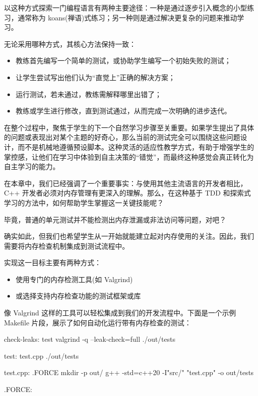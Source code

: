 以这种方式探索一门编程语言有两种主要途径：一种是通过逐步引入概念的小型练习，通常称为 koans(禅语)式练习；另一种则是通过解决更复杂的问题来推动学习。

无论采用哪种方式，其核心方法保持一致：

\begin{itemize}
\item 
教练首先编写一个简单的测试，或协助学生编写一个初始失败的测试；

\item 
让学生尝试写出他们认为“直觉上”正确的解决方案；

\item 
运行测试，若未通过，教练需解释哪里出错了；

\item 
教练或学生进行修改，直到测试通过，从而完成一次明确的进步迭代。
\end{itemize}

在整个过程中，聚焦于学生的下一个自然学习步骤至关重要。如果学生提出了具体的问题或表现出对某个主题的好奇心，那么当前的测试完全可以围绕这些问题设计，而不是机械地遵循预设脚本。这种灵活的适应性教学方式，有助于增强学生的掌控感，让他们在学习中体验到自主决策的“错觉”，而最终这种感觉会真正转化为自主学习的能力。


在本章中，我们已经强调了一个重要事实：与使用其他主流语言的开发者相比，C++ 开发者必须对内存管理有更深入的理解。那么，在这种基于 TDD 和探索式学习的方法中，如何帮助学生掌握这一关键技能呢？

毕竟，普通的单元测试并不能检测出内存泄漏或非法访问等问题，对吧？

确实如此，但我们也希望学生从一开始就能建立起对内存使用的关注。因此，我们需要将内存检查机制集成到测试流程中。

实现这一目标主要有两种方式：

\begin{itemize}
\item 
使用专门的内存检测工具(如 Valgrind)

\item 
或选择支持内存检查功能的测试框架或库
\end{itemize}

像 Valgrind 这样的工具可以轻松集成到我们的开发流程中。下面是一个示例 Makefile 片段，展示了如何自动化运行带有内存检查的测试：

\begin{shell}
check-leaks: test
  valgrind -q --leak-check=full ./out/tests

test: test.cpp
  ./out/tests

test.cpp: .FORCE
  mkdir -p out/
  g++ -std=c++20 -I"src/" "test.cpp" -o out/tests

.FORCE:
\end{shell}

